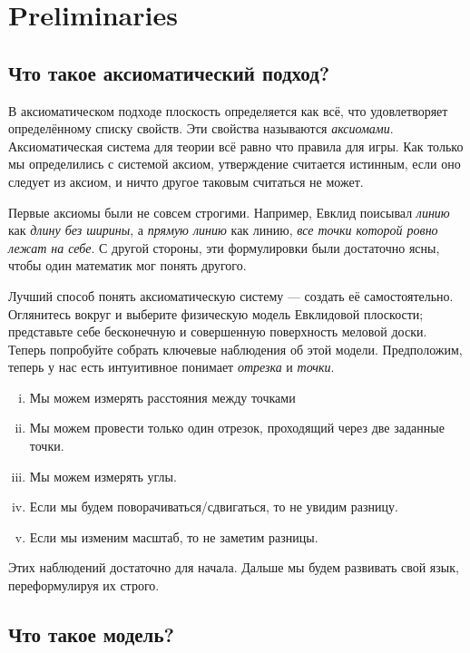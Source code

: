 \chapter{Preliminaries}\label{chap:metr}

\section*{Что такое аксиоматический подход?}

В аксиоматическом подходе плоскость определяется как всё, что удовлетворяет определённому списку свойств.
Эти свойства называются {}\emph{аксиомами}.
Аксиоматическая система для теории
всё равно что правила для игры.
Как только мы определились с системой аксиом, утверждение считается истинным, если оно следует из аксиом, и ничто другое таковым считаться не может.

Первые аксиомы были не совсем строгими.
Например, Евклид поисывал {}\emph{линию} как {}\emph{длину без ширины},
а {}\emph{прямую линию} как линию, {}\emph{все точки которой ровно лежат на себе}.
С другой стороны,
эти формулировки были достаточно ясны,
чтобы один математик мог понять другого.

Лучший способ понять аксиоматическую систему
— создать её самостоятельно.
Оглянитесь вокруг и выберите физическую модель
Евклидовой плоскости;
представьте себе бесконечную и совершенную поверхность меловой доски.
Теперь попробуйте собрать ключевые наблюдения
об этой модели.
Предположим, теперь у нас есть интуитивное понимает {}\emph{отрезка} и {}\emph{точки}.
\begin{enumerate}[(i)]
 \item\label{preaxiomI} Мы можем измерять расстояния между точками
 \item\label{preaxiomII} Мы можем провести только один отрезок,
проходящий через две заданные точки.
 \item\label{preaxiomIII} Мы можем измерять углы.
 \item\label{preaxiomIV} Если мы будем поворачиваться/сдвигаться, то не увидим разницу.
 \item\label{preaxiomV} Если мы изменим масштаб, то не заметим разницы.
\end{enumerate}
Этих наблюдений достаточно для начала.
Дальше мы будем развивать свой язык,
переформулируя их строго.

\section*{Что такое модель?}
\label{page:model}

